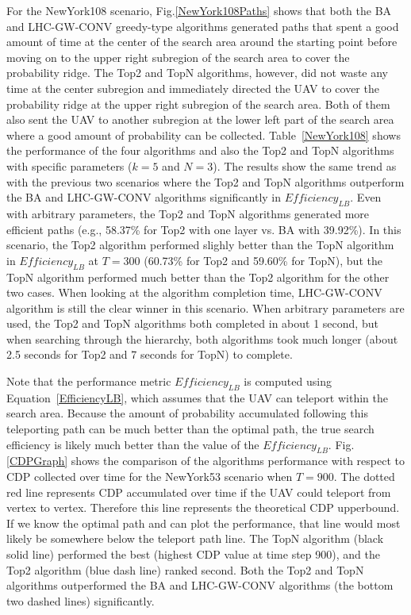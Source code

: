 For the NewYork108 scenario, Fig.\ref{NewYork108Paths} shows that both the BA and LHC-GW-CONV greedy-type algorithms generated paths that spent a good amount of time at the center of the search area around the starting point before moving on to the upper right subregion of the search area to cover the probability ridge. The Top2 and TopN algorithms, however, did not waste any time at the center subregion and immediately directed the UAV to cover the probability ridge at the upper right subregion of the search area. Both of them also sent the UAV to another subregion at the lower left part of the search area where a good amount of probability can be collected. Table~\ref{NewYork108} shows the performance of the four algorithms and also the Top2 and TopN algorithms with specific parameters ($k=5$ and $N=3$). The results show the same trend as with the previous two scenarios where the Top2 and TopN algorithms outperform the BA and LHC-GW-CONV algorithms significantly in $\mathit{Efficiency_{LB}}$. Even with arbitrary parameters, the Top2 and TopN algorithms generated more efficient paths (e.g., 58.37\% for Top2 with one layer vs. BA with 39.92\%). In this scenario, the Top2 algorithm performed slighly better than the TopN algorithm in $\mathit{Efficiency_{LB}}$ at $T=300$ (60.73\% for Top2 and 59.60\% for TopN), but the TopN algorithm performed much better than the Top2 algorithm for the other two cases. When looking at the algorithm completion time, LHC-GW-CONV algorithm is still the clear winner in this scenario. When arbitrary parameters are used, the Top2 and TopN algorithms both completed in about 1 second, but when searching through the hierarchy, both algorithms took much longer (about 2.5 seconds for Top2 and 7 seconds for TopN) to complete.


Note that the performance metric $\mathit{Efficiency_{LB}}$ is computed using Equation~\ref{EfficiencyLB}, which assumes that the UAV can teleport within the search area. Because the amount of probability accumulated following this teleporting path can be much better than the optimal path, the true search efficiency is likely much better than the value of the $\mathit{Efficiency_{LB}}$. Fig.\ref{CDPGraph} shows the comparison of the algorithms performance with respect to CDP collected over time for the NewYork53 scenario when $T=900$. The dotted red line represents CDP accumulated over time if the UAV could teleport from vertex to vertex. Therefore this line represents the theoretical CDP upperbound. If we know the optimal path and can plot the performance, that line would most likely be somewhere below the teleport path line. The TopN algorithm (black solid line) performed the best (highest CDP value at time step 900), and the Top2 algorithm (blue dash line) ranked second. Both the Top2 and TopN algorithms outperformed the BA and LHC-GW-CONV algorithms (the bottom two dashed lines) significantly.

